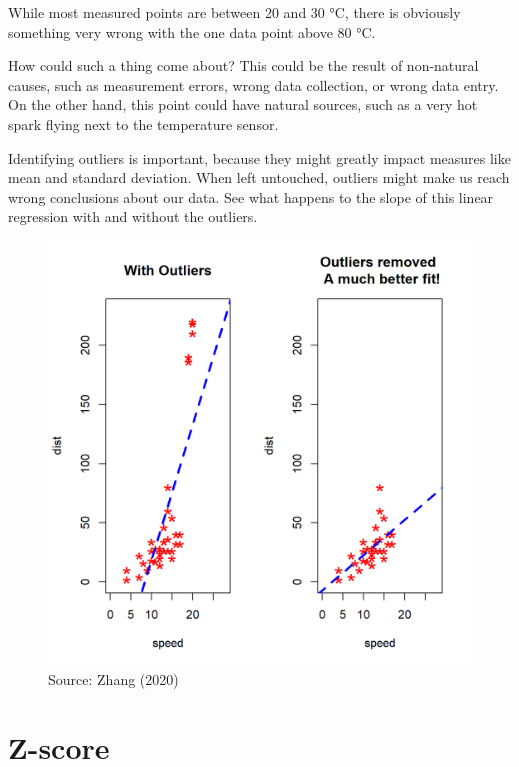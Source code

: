 \documentclass[
  letterpaper,
  DIV=11,
  numbers=noendperiod,
  oneside]{scrreprt}
\begin{document}
While most measured points are between 20 and 30 °C, there is obviously
something very wrong with the one data point above 80 °C.

How could such a thing come about? This could be the result of
non-natural causes, such as measurement errors, wrong data collection,
or wrong data entry. On the other hand, this point could have natural
sources, such as a very hot spark flying next to the temperature sensor.

Identifying outliers is important, because they might greatly impact
measures like mean and standard deviation. When left untouched, outliers
might make us reach wrong conclusions about our data. See what happens
to the slope of this linear regression with and without the outliers.

\begin{figure}

{\centering \includegraphics{outliers/regression-outlier.png}

}

\caption{Source: Zhang (2020)}

\end{figure}

\hypertarget{z-score}{%
\chapter{Z-score}\label{z-score}}
\end{document}
